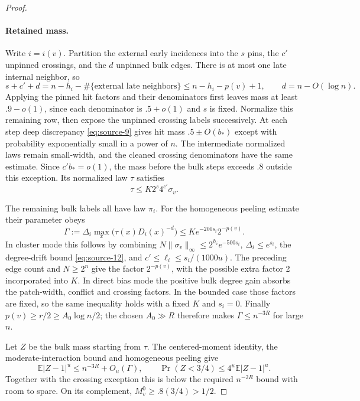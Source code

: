\begin{proof}\leavevmode\par
\paragraph{Retained mass.}
Write \(i=i(v)\). Partition the external early incidences into the \(s\)
pins, the \(c'\) unpinned crossings, and the \(d\) unpinned bulk edges.
There is at most one late internal neighbor, so
\[
 s+c'+d=n-h_i-\#\{\text{external late neighbors}\}
             \le n-h_i-p(v)+1,
 \qquad d=n-O(\log n).
\]
Applying the pinned hit factors and their denominators first leaves mass
at least \(.9-o(1)\), since each denominator is \(.5+o(1)\) and \(s\)
is fixed. Normalize this remaining row, then expose the unpinned crossing
labels successively. At each step deep discrepancy
\eqref{eq:source-9} gives hit mass \(.5\pm O(b_*)\) except with
probability exponentially small in a power of \(n\). The intermediate
normalized laws remain small-width, and the cleaned crossing denominators
have the same estimate. Since \(c'b_*=o(1)\), the mass before the bulk
steps exceeds \(.8\) outside this exception. Its normalized law \(\tau\)
satisfies
\[
 \tau\le K2^s4^{c'}\sigma_v.
\]

The remaining bulk labels all have law \(\pi_i\). For the homogeneous
peeling estimate their parameter obeys
\[
 \Gamma:=\Delta_i\max_x\bigl(\tau(x)D_i(x)^{-d}\bigr)
          \le K e^{-200s_i}2^{-p(v)}.
\]
In cluster mode this follows by combining
\(N\|\sigma_v\|_\infty\le2^{h_i}e^{-500s_i}\),
\(\Delta_i\le e^{s_i}\), the degree-drift bound
\eqref{eq:source-12}, and \(c'\le\ell_i\le s_i/(1000u)\).
The preceding edge count and \(N\ge2^n\) give the factor
\(2^{-p(v)}\), with the possible extra factor 2 incorporated into \(K\).
In direct bias mode the positive bulk degree gain absorbs the patch-width,
conflict and crossing factors. In the bounded case those factors are fixed,
so the same inequality holds with a fixed \(K\) and \(s_i=0\).
Finally
\(p(v)\ge r/2\ge A_0\log n/2\); the chosen \(A_0\gg R\) therefore
makes \(\Gamma\le n^{-3R}\) for large \(n\).

Let \(Z\) be the bulk mass starting from \(\tau\). The centered-moment
identity, the moderate-interaction bound and homogeneous peeling give
\[
 \mathbb E|Z-1|^u\le n^{-3R}+O_u(\Gamma),\qquad
 \Pr(Z<3/4)\le4^u\mathbb E|Z-1|^u.
\]
Together with the crossing exception this is below the required
\(n^{-2R}\) bound with room to spare. On its complement,
\(M_v^0\ge .8(3/4)>1/2\).


\end{proof}
